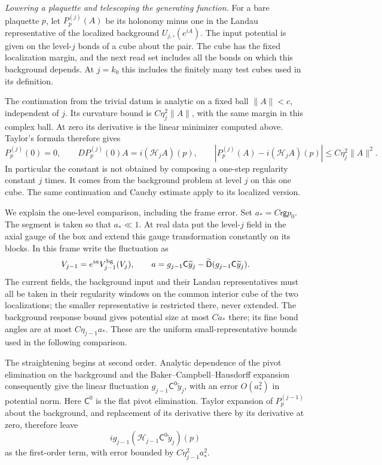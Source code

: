 \documentclass[11pt,letterpaper,reqno]{amsart}
\theoremstyle{definition}
\theoremstyle{remark}
\begin{document}
\emph{Lowering a plaquette and telescoping the generating function.}
For a bare plaquette $p$, let $P_p^{(j)}(A)$ be its holonomy
minus one in the Landau representative of the localized
background $U_{j,\square}(e^{iA})$. The input potential is given
on the level-$j$ bonds of a cube about the pair. The cube has the
fixed localization margin, and the next read set includes all
the bonds on which this background depends. At $j=k_0$ this
includes the finitely many test cubes used in its definition.

The continuation from the trivial datum is analytic on a fixed
ball $\|A\|<c$, independent of $j$. Its curvature bound is
$C\eta_j^2\|A\|$, with the same margin in this complex ball.
At zero its derivative is the linear minimizer computed above.
Taylor's formula therefore gives
\[
 P_p^{(j)}(0)=0,\qquad
 DP_p^{(j)}(0)A=i(\mathcal H_jA)(p),\qquad
 |P_p^{(j)}(A)-i(\mathcal H_jA)(p)|
                                       \le C\eta_j^2\|A\|^2.
\]
In particular the constant is not obtained by composing a
one-step regularity constant $j$ times. It comes from the
background problem at level $j$ on this one cube. The same
continuation and Cauchy estimate apply to its localized version.

We explain the one-level comparison, including the frame error.
Set $a_*=C\mathsf r\mathsf g p_0$. The segment is taken so
that $a_*\ll1$. At real data put the level-$j$ field in the
axial gauge of the box and extend this gauge transformation
constantly on its blocks. In this frame write the fluctuation as
\[
 V_{j-1}=e^{ia}V_{j-1}^{\rm bg}(V_j),\qquad
 a=g_{j-1}\mathsf C\widetilde y_j
                -\widetilde{\mathsf D}(g_{j-1}\mathsf C\widetilde y_j).
\]
The current fields, the background input and their Landau
representatives must all be taken in their regularity windows
on the common interior cube of the two localizations; the
smaller representative is restricted there, never extended.
The background response bound gives potential
size at most $Ca_*$ there; its fine bond angles are at most
$C\eta_{j-1}a_*$. These are the uniform small-representative
bounds used in the following comparison.

The straightening begins at second order. Analytic dependence
of the pivot elimination on the background and the
Baker--Campbell--Hausdorff expansion consequently give the
linear fluctuation $g_{j-1}\mathsf C^0\widetilde y_j$, with
an error $O(a_*^2)$ in potential norm. Here $\mathsf C^0$
is the flat pivot elimination. Taylor expansion of
$P_p^{(j-1)}$ about the background, and replacement of its
derivative there by its derivative at zero, therefore leave
\[
 ig_{j-1}(\mathcal H_{j-1}\mathsf C^0\widetilde y_j)(p)
\]
as the first-order term, with error bounded by
$C\eta_{j-1}^2a_*^2$.
\end{document}
